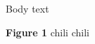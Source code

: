 \documentclass{article}
\begin{document}




Body text

\begin{center}
\textbf{Figure 1} chili chili
\end{center}
\end{document}
